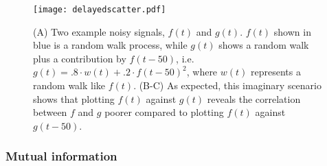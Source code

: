 {\begin{figure}
	\centering
	\texttt{[image: delayedscatter.pdf]}
	\caption{ 
		(A) Two example noisy signals, $f(t)$ and $g(t)$. $f(t)$ shown in blue is a random walk process, while $g(t)$ shows a random walk plus a contribution by $f(t-50)$, i.e. $g(t)=.8\cdot w(t)+.2\cdot f(t-50)^2$, where $w(t)$ represents a random walk like $f(t)$.
		(B-C) As expected, this imaginary scenario shows that plotting $f(t)$ against $g(t)$ reveals the correlation between $f$ and $g$ poorer compared to plotting $f(t)$ against $g(t-50)$.
	}
	\label{fig:mm:delayedscatter}
\end{figure}


\subsubsection{Mutual information}

%

}
